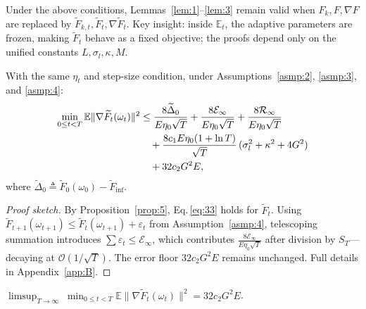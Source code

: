 \begin{proposition}\label{prop:5}
  Under the above conditions, Lemmas~\ref{lem:1}--\ref{lem:3} remain valid when
  \(F_k, F, \nabla F\) are replaced by \(\widetilde F_{k,t}, \widetilde F_t, \nabla\widetilde F_t\).
  Key insight: inside \(\mathbb E_t\), the adaptive parameters are frozen, making \(\widetilde F_t\) behave as a fixed objective;
  the proofs depend only on the unified constants \(L, \sigma_l, \kappa, M\).
\end{proposition}

\begin{theorem}\label{thm:2}
  With the same \(\eta_t\) and step-size condition, under
  Assumptions~\ref{asmp:2}, \ref{asmp:3}, and \ref{asmp:4}:
  \begin{align}
    \min_{0 \le t < T} \mathbb E\|\nabla\widetilde F_t(\omega_t)\|^2
    &\le \frac{8\widetilde\Delta_0}{E\eta_0\sqrt{T}}
       + \frac{8\mathcal E_\infty}{E\eta_0\sqrt{T}}
       + \frac{8\mathcal R_\infty}{E\eta_0\sqrt{T}} \notag\\
    &\quad + \frac{8c_1 E\eta_0(1 + \ln T)}{\sqrt{T}}\,
          (\sigma_l^2 + \kappa^2 + 4G^2) \notag\\
    &\quad + 32 c_2 G^2 E, 
    \label{eq:42}
  \end{align}
  where \(\widetilde\Delta_0 \triangleq \widetilde F_0(\omega_0) - \widetilde F_{\inf}\).
\end{theorem}

\begin{proof}[Proof sketch]
  By Proposition~\ref{prop:5}, Eq.\,\eqref{eq:33} holds for \(\widetilde F_t\).
  Using \(\widetilde F_{t+1}(\omega_{t+1}) \le \widetilde F_t(\omega_{t+1}) + \varepsilon_t\) from Assumption~\ref{asmp:4},
  telescoping summation introduces \(\sum\varepsilon_t \le \mathcal E_\infty\),
  which contributes \(\frac{8\mathcal E_\infty}{E\eta_0\sqrt{T}}\) after division by \(S_T\)---decaying at \(\mathcal O(1/\sqrt{T})\).
  The error floor \(32 c_2 G^2 E\) remains unchanged.
  Full details in Appendix~\ref{app:B}.
\end{proof}

\begin{corollary}\label{cor:2}
  \(\displaystyle \limsup_{T\to\infty}\;\min_{0\le t<T} \mathbb E\|\nabla\widetilde F_t(\omega_t)\|^2 = 32 c_2 G^2 E\).
\end{corollary}

